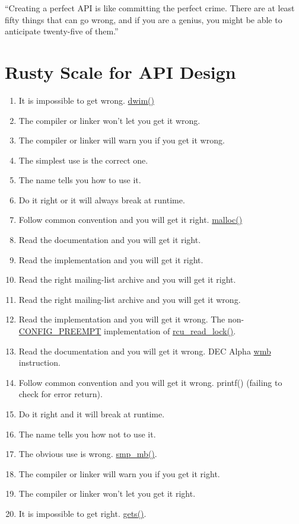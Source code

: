 

``Creating a perfect API is like committing the perfect crime.
There are at least fifty things that can go wrong, and if you are
a genius, you might be able to anticipate twenty-five of them.''

\section{Rusty Scale for API Design}
\label{sec:easy:Rusty Scale for API Design}


\begin{enumerate}
\item	It is impossible to get wrong.  \url{dwim()}
\item	The compiler or linker won't let you get it wrong.
\item	The compiler or linker will warn you if you get it wrong.
\item	The simplest use is the correct one.
\item	The name tells you how to use it.
\item	Do it right or it will always break at runtime.
\item	Follow common convention and you will get it right.  \url{malloc()}
\item	Read the documentation and you will get it right.
\item	Read the implementation and you will get it right.
\item	Read the right mailing-list archive and you will get it right.
\item	Read the right mailing-list archive and you will get it wrong.
\item	Read the implementation and you will get it wrong.
	The non-\url{CONFIG_PREEMPT} implementation of \url{rcu_read_lock()}.
\item	Read the documentation and you will get it wrong.  DEC Alpha \url{wmb}
	instruction.
\item	Follow common convention and you will get it wrong.
	printf() (failing to check for error return).
\item	Do it right and it will break at runtime.
\item	The name tells you how not to use it.
\item	The obvious use is wrong.  \url{smp_mb()}.
\item	The compiler or linker will warn you if you get it right.
\item	The compiler or linker won't let you get it right.
\item	It is impossible to get right.  \url{gets()}.
\end{enumerate}

